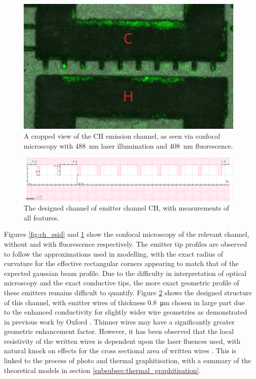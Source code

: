 \begin{refsection}
\begin{figure}[H]
    \centering
    \includegraphics[width=\linewidth]{Chapter7/Figs/Raster/ch_channel_fl.jpg}
    \caption{A cropped view of the CH emission channel, as seen via confocal microscopy with 488~\si{\nano\metre} laser illumination and 408~\si{\nano\metre} fluorescence.}
    \label{fig:ch_fl}
\end{figure}

\begin{figure}[H]
    \centering
    \includegraphics[width=0.8\linewidth]{Chapter7/Figs/Raster/ch_design2.png}
    \caption{The designed channel of emitter channel CH, with measurements of all features.}
    \label{fig:ch_design}
\end{figure}

Figures \ref{fig:ch_esid} and \ref{fig:ch_fl} show the confocal microscopy of the relevant channel, without and with fluorescence respectively. The emitter tip profiles are observed to follow the approximations used in modelling, with the exact radius of curvature for the effective rectangular corners appearing to match that of the expected gaussian beam profile. Due to the difficulty in interpretation of optical microscopy and the exact conductive tips, the more exact geometric profile of these emitters remains difficult to quantify. Figure \ref{fig:ch_design} shows the designed structure of this channel, with emitter wires of thickness 0.8~\si{\micro\metre} chosen in large part due to the enhanced conductivity for slightly wider wire geometries as demonstrated in previous work by Oxford \cite{sun2014}. Thinner wires may have a significantly greater geometric enhancement factor. However, it has been observed that the local resistivity of the written wires is dependent upon the laser fluences used, with natural knock on effects for the cross sectional area of written wires \cite{sun2014}. This is linked to the process of photo and thermal graphitisation, with a summary of the theoretical models in section \ref{subsubsec:thermal_graphitisation}. 


\end{refsection}
